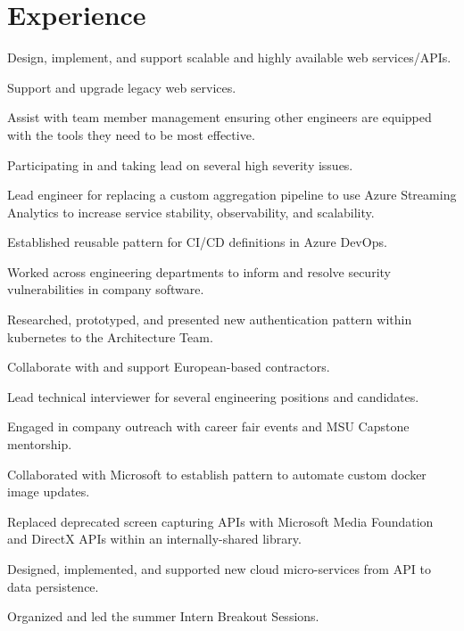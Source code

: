 \documentclass[]{deedy-resume-openfont}
\begin{document}
\hfill
\begin{minipage}[t]{0.66\textwidth} 


\section{Experience}

\vspace{\topsep} %
\begin{tightemize}
        \item Design, implement, and support scalable and highly available web services/APIs.
        \item Support and upgrade legacy web services.
        \item Assist with team member management ensuring other engineers are equipped with the tools they need to be most effective.
        \item Participating in and taking lead on several high severity issues.
        \item Lead engineer for replacing a custom aggregation pipeline to use Azure Streaming Analytics to increase service stability, observability, and scalability.
        \item Established reusable pattern for CI/CD definitions in Azure DevOps.
        \item Worked across engineering departments to inform and resolve security vulnerabilities in company software.
        \item Researched, prototyped, and presented new authentication pattern within kubernetes to the Architecture Team.
        \item Collaborate with and support European-based contractors.
        \item Lead technical interviewer for several engineering positions and candidates.
        \item Engaged in company outreach with career fair events and MSU Capstone mentorship.
        \item Collaborated with Microsoft to establish pattern to automate custom docker image updates.
    \end{tightemize}
\sectionsep
\sectionsep

\begin{tightemize}
    \item Replaced deprecated screen capturing APIs with Microsoft Media Foundation and DirectX APIs within an internally-shared library.
    \item Designed, implemented, and supported new cloud micro-services from API to data persistence.
    \item Organized and led the summer Intern Breakout Sessions.
    \end{tightemize}
\sectionsep
\sectionsep


\end{minipage}
\end{document}
